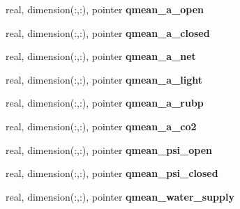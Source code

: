 \begin{DoxyCompactItemize}
\item 
\hypertarget{structed__state__vars_1_1edtype_a7ba46c9f6f3ad6075998128b82dff1d5}{
real, dimension(:,:), pointer {\bfseries qmean\_\-a\_\-open}}
\label{structed__state__vars_1_1edtype_a7ba46c9f6f3ad6075998128b82dff1d5}

\item 
\hypertarget{structed__state__vars_1_1edtype_ae2f2d94c4527f56ebc34b34c09158d15}{
real, dimension(:,:), pointer {\bfseries qmean\_\-a\_\-closed}}
\label{structed__state__vars_1_1edtype_ae2f2d94c4527f56ebc34b34c09158d15}

\item 
\hypertarget{structed__state__vars_1_1edtype_a83e11115ad959ca5810d9dae8af7f93b}{
real, dimension(:,:), pointer {\bfseries qmean\_\-a\_\-net}}
\label{structed__state__vars_1_1edtype_a83e11115ad959ca5810d9dae8af7f93b}

\item 
\hypertarget{structed__state__vars_1_1edtype_aef1573e62b697ea715c4938507b78d5c}{
real, dimension(:,:), pointer {\bfseries qmean\_\-a\_\-light}}
\label{structed__state__vars_1_1edtype_aef1573e62b697ea715c4938507b78d5c}

\item 
\hypertarget{structed__state__vars_1_1edtype_a7095331afae5a55ec3c78426a04f1476}{
real, dimension(:,:), pointer {\bfseries qmean\_\-a\_\-rubp}}
\label{structed__state__vars_1_1edtype_a7095331afae5a55ec3c78426a04f1476}

\item 
\hypertarget{structed__state__vars_1_1edtype_a76055dc571678892179e6a505db27447}{
real, dimension(:,:), pointer {\bfseries qmean\_\-a\_\-co2}}
\label{structed__state__vars_1_1edtype_a76055dc571678892179e6a505db27447}

\item 
\hypertarget{structed__state__vars_1_1edtype_a1111fdb16dc8690a24cb2acf22493b11}{
real, dimension(:,:), pointer {\bfseries qmean\_\-psi\_\-open}}
\label{structed__state__vars_1_1edtype_a1111fdb16dc8690a24cb2acf22493b11}

\item 
\hypertarget{structed__state__vars_1_1edtype_a133b6ef2e91099c3d9a23f1e23463761}{
real, dimension(:,:), pointer {\bfseries qmean\_\-psi\_\-closed}}
\label{structed__state__vars_1_1edtype_a133b6ef2e91099c3d9a23f1e23463761}

\item 
\hypertarget{structed__state__vars_1_1edtype_aaa4551aa9b55c5bfb7e14ec89c03fa98}{
real, dimension(:,:), pointer {\bfseries qmean\_\-water\_\-supply}}
\label{structed__state__vars_1_1edtype_aaa4551aa9b55c5bfb7e14ec89c03fa98}


\end{DoxyCompactItemize}
